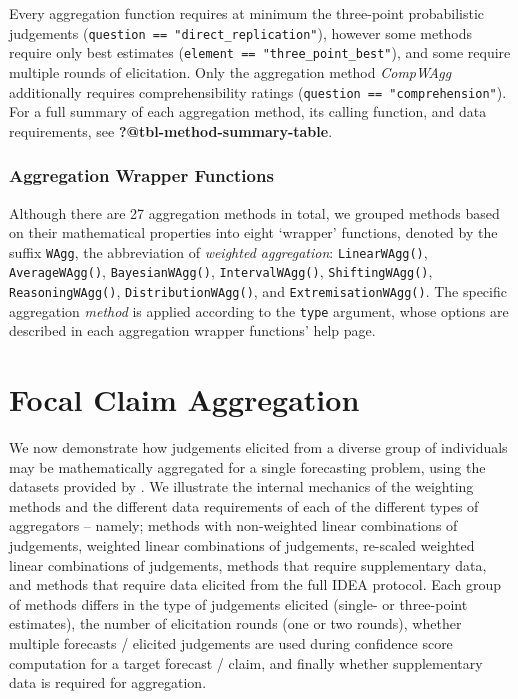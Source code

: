 \documentclass[article]{jss}
\begin{document}
Every aggregation function requires at minimum the three-point
probabilistic judgements (\texttt{question\ ==\ "direct\_replication"}),
however some methods require only best estimates
(\texttt{element\ ==\ "three\_point\_best"}), and some require multiple
rounds of elicitation. Only the aggregation method \emph{CompWAgg}
additionally requires comprehensibility ratings
(\texttt{question\ ==\ "comprehension"}). For a full summary of each
aggregation method, its calling function, and data requirements, see
\textbf{?@tbl-method-summary-table}.

\subsubsection{Aggregation Wrapper
Functions}\label{aggregation-wrapper-functions}

Although there are 27 aggregation methods in total, we grouped methods
based on their mathematical properties into eight `wrapper' functions,
denoted by the suffix \texttt{WAgg}, the abbreviation of \emph{weighted
aggregation}: \texttt{LinearWAgg()}, \texttt{AverageWAgg()},
\texttt{BayesianWAgg()}, \texttt{IntervalWAgg()},
\texttt{ShiftingWAgg()}, \texttt{ReasoningWAgg()},
\texttt{DistributionWAgg()}, and \texttt{ExtremisationWAgg()}. The
specific aggregation \emph{method} is applied according to the
\texttt{type} argument, whose options are described in each aggregation
wrapper functions' help page.

\section{Focal Claim Aggregation}\label{sec-focal-claims}

We now demonstrate how judgements elicited from a diverse group of
individuals may be mathematically aggregated for a single forecasting
problem, using the datasets provided by . We illustrate
the internal mechanics of the weighting methods and the different data
requirements of each of the different types of aggregators -- namely;
methods with non-weighted linear combinations of judgements, weighted
linear combinations of judgements, re-scaled weighted linear
combinations of judgements, methods that require supplementary data, and
methods that require data elicited from the full IDEA protocol. Each
group of methods differs in the type of judgements elicited (single- or
three-point estimates), the number of elicitation rounds (one or two
rounds), whether multiple forecasts / elicited judgements are used
during confidence score computation for a target forecast / claim, and
finally whether supplementary data is required for aggregation.
\end{document}
